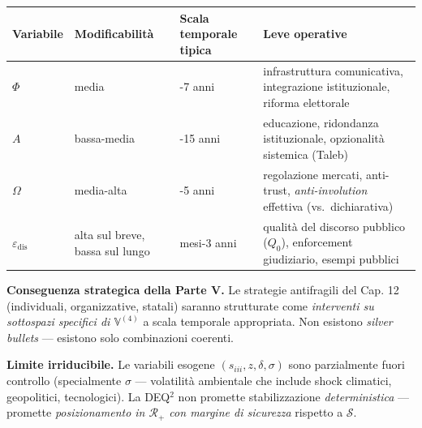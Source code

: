 {\def\LTcaptype{none} %
{\small\begin{longtable}[]{@{}
  >{\raggedright\arraybackslash}p{}
  >{\raggedright\arraybackslash}p{}
  >{\raggedright\arraybackslash}p{}
  >{\raggedright\arraybackslash}p{}@{}}
\toprule\noalign{}
\begin{minipage}[b]{\linewidth}\raggedright
Variabile
\end{minipage} & \begin{minipage}[b]{\linewidth}\raggedright
Modificabilità
\end{minipage} & \begin{minipage}[b]{\linewidth}\raggedright
Scala temporale tipica
\end{minipage} & \begin{minipage}[b]{\linewidth}\raggedright
Leve operative
\end{minipage} \\
\midrule\noalign{}
\endhead
\bottomrule\noalign{}
\endlastfoot
\(\Phi\) & media & 3-7 anni & infrastruttura comunicativa, integrazione
istituzionale, riforma elettorale \\
\(A\) & bassa-media & 5-15 anni & educazione, ridondanza istituzionale,
opzionalità sistemica (Taleb) \\
\(\Omega\) & media-alta & 1-5 anni & regolazione mercati, anti-trust,
\emph{anti-involution} effettiva (vs.~dichiarativa) \\
\(\varepsilon_{\text{dis}}\) & alta sul breve, bassa sul lungo & 6
mesi-3 anni & qualità del discorso pubblico (\(Q_0\)), enforcement
giudiziario, esempi pubblici \\
\end{longtable}}
}

\Proved{} \textbf{Conseguenza strategica della Parte V.} Le strategie
antifragili del Cap. 12 (individuali, organizzative, statali) saranno
strutturate come \emph{interventi su sottospazi specifici di
\(\mathbb{V}^{(4)}\)} a scala temporale appropriata. Non esistono
\emph{silver bullets} --- esistono solo combinazioni coerenti.

\Conj{} \textbf{Limite irriducibile.} Le variabili esogene
\((s_{iii}, z, \delta, \sigma)\) sono parzialmente fuori controllo
(specialmente \(\sigma\) --- volatilità ambientale che include shock
climatici, geopolitici, tecnologici). La DEQ$^2$ non promette
stabilizzazione \emph{deterministica} --- promette \emph{posizionamento
in \(\mathcal{R}_+\) con margine di sicurezza} rispetto a
\(\mathcal{S}\).



